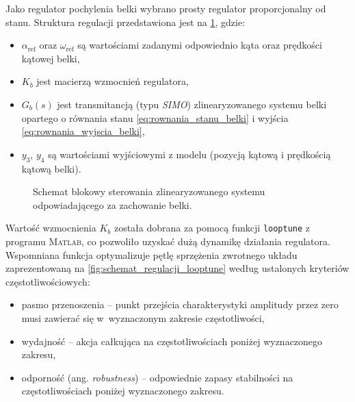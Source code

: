 Jako regulator pochylenia belki wybrano prosty regulator proporcjonalny od stanu. Struktura regulacji przedstawiona jest na \cref{fig:schemat_regulacji_belka}, gdzie:
\begin{itemize}
    \item $\alpha_\text{ref}$ oraz $\omega_\text{ref}$ są wartościami zadanymi odpowiednio kąta oraz prędkości kątowej belki,
    \item $K_b$ jest macierzą wzmocnień regulatora,
    \item $G_b(s)$ jest transmitancją (typu \textit{SIMO}) zlinearyzowanego systemu belki opartego o równania stanu \eqref{eq:rownania_stanu_belki} i wyjścia \eqref{eq:rownania_wyjscia_belki},
    \item $y_3$, $y_4$ są wartościami wyjściowymi z modelu (pozycją kątową i prędkością kątową belki).
\end{itemize}

\begin{figure}[ht]
    \centering
    
    
    \caption{Schemat blokowy sterowania zlinearyzowanego systemu odpowiadającego za zachowanie belki.}
    \label{fig:schemat_regulacji_belka}
\end{figure}

Wartość wzmocnienia $K_b$ została dobrana za pomocą funkcji \texttt{looptune} z programu \textsc{Matlab}, co pozwoliło uzyskać dużą dynamikę działania regulatora. Wspomniana funkcja optymalizuje pętlę sprzężenia zwrotnego układu zaprezentowaną na \cref{fig:schemat_regulacji_looptune} według ustalonych kryteriów częstotliwościowych: \begin{itemize}
    \item pasmo przenoszenia -- punkt przejścia charakterystyki amplitudy przez zero musi zawierać się w~wyznaczonym zakresie częstotliwości,
    \item wydajność -- akcja całkująca na częstotliwościach poniżej wyznaczonego zakresu,
    \item odporność (ang. \textit{robustness}) -- odpowiednie zapasy stabilności na częstotliwościach poniżej wyznaczonego zakresu.
\end{itemize}

